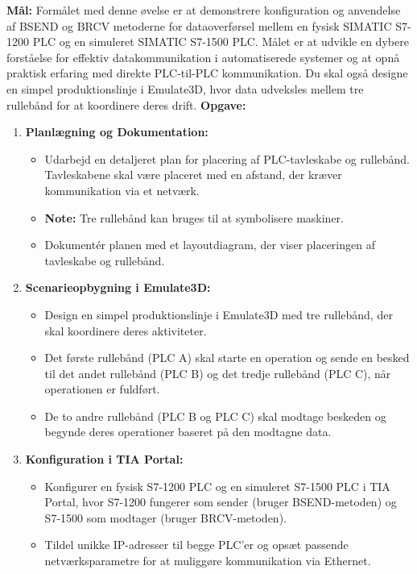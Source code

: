 \textbf{Mål:} Formålet med denne øvelse er at demonstrere konfiguration og anvendelse af BSEND og BRCV metoderne for dataoverførsel mellem en fysisk SIMATIC S7-1200 PLC og en simuleret SIMATIC S7-1500 PLC. Målet er at udvikle en dybere forståelse for effektiv datakommunikation i automatiserede systemer og at opnå praktisk erfaring med direkte PLC-til-PLC kommunikation. Du skal også designe en simpel produktionslinje i Emulate3D, hvor data udveksles mellem tre rullebånd for at koordinere deres drift.
\newline\newline
\noindent\textbf{Opgave:}
\begin{enumerate}
	\item \textbf{Planlægning og Dokumentation:}
	\begin{itemize}
		\item Udarbejd en detaljeret plan for placering af PLC-tavleskabe og rullebånd. Tavleskabene skal være placeret med en afstand, der kræver kommunikation via et netværk.
		\item \textbf{Note:} Tre rullebånd kan bruges til at symbolisere maskiner.
		\item Dokumentér planen med et layoutdiagram, der viser placeringen af tavleskabe og rullebånd.
	\end{itemize}
	\item \textbf{Scenarieopbygning i Emulate3D:}
	\begin{itemize}
		\item Design en simpel produktionslinje i Emulate3D med tre rullebånd, der skal koordinere deres aktiviteter.
		\item Det første rullebånd (PLC A) skal starte en operation og sende en besked til det andet rullebånd (PLC B) og det tredje rullebånd (PLC C), når operationen er fuldført.
		\item De to andre rullebånd (PLC B og PLC C) skal modtage beskeden og begynde deres operationer baseret på den modtagne data.
	\end{itemize}
	\item \textbf{Konfiguration i TIA Portal:}
	\begin{itemize}
		\item Konfigurer en fysisk S7-1200 PLC og en simuleret S7-1500 PLC i TIA Portal, hvor S7-1200 fungerer som sender (bruger BSEND-metoden) og S7-1500 som modtager (bruger BRCV-metoden).
		\item Tildel unikke IP-adresser til begge PLC'er og opsæt passende netværksparametre for at muliggøre kommunikation via Ethernet.

\end{itemize}
\end{enumerate}
